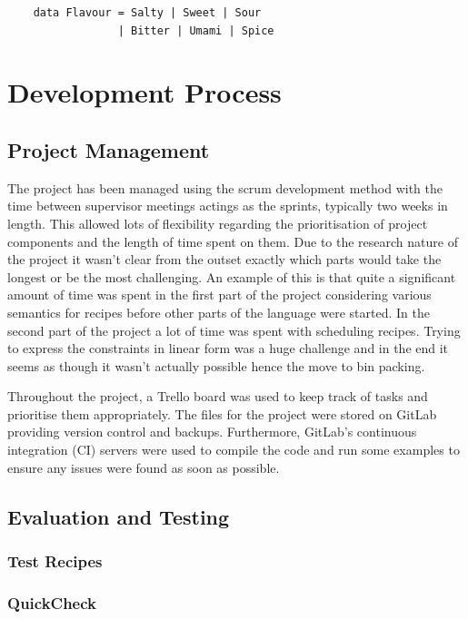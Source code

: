 \documentclass[11pt]{article}
\begin{document}
\begin{lstlisting}
    data Flavour = Salty | Sweet | Sour
                 | Bitter | Umami | Spice
\end{lstlisting}

\section{Development Process}

\subsection{Project Management}

The project has been managed using the scrum development method with the time
between supervisor meetings actings as the sprints, typically two weeks in length.
This allowed lots of flexibility regarding the prioritisation of project
components and the length of time spent on them. Due to the research nature
of the project it wasn't clear from the outset exactly which parts would take the
longest or be the most challenging. An example of this is that
quite a significant amount of time was spent in the first part of the project
considering various semantics for recipes before other parts of the language
were started. In the second part of the project a lot of time was spent
with scheduling recipes. Trying to express the constraints in linear form
was a huge challenge and in the end it seems as though it wasn't actually possible
hence the move to bin packing.

\medbreak

Throughout the project, a Trello board was used to keep track of tasks
and prioritise them appropriately. The files for the project were stored
on GitLab providing version control and backups. Furthermore, GitLab's
continuous integration (CI) servers were used to compile the code and run
some examples to ensure any issues were found as soon as possible.

\subsection{Evaluation and Testing}

\subsubsection{Test Recipes}

\subsubsection{QuickCheck}
\end{document}
